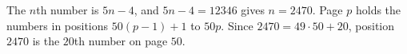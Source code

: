The $n$th number is $5n-4$, and $5n-4=12346$ gives $n=2470$. Page $p$ holds the numbers in positions $50(p-1)+1$ to $50p$. Since $2470=49\cdot50+20$, position $2470$ is the $20$th number on page $\boxed{50}$.
